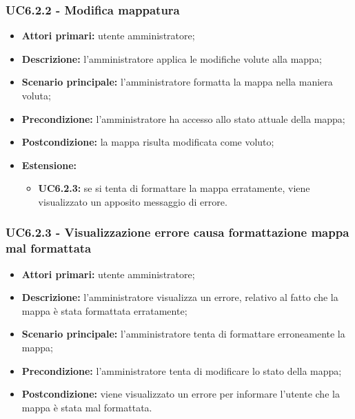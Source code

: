 	\subsubsection{UC6.2.2 - Modifica mappatura}
	\begin{itemize}
		\item \textbf{Attori primari:} utente amministratore;
		\item \textbf{Descrizione:} l'amministratore applica le modifiche volute alla mappa;
		\item \textbf{Scenario principale:} l'amministratore formatta la mappa nella maniera voluta;		
		\item \textbf{Precondizione:} l'amministratore ha accesso allo stato attuale della mappa;
		\item \textbf{Postcondizione:} la mappa risulta modificata come voluto;
		\item \textbf{Estensione:}
		\begin{itemize}
			\item \textbf{UC6.2.3:} se si tenta di formattare la mappa erratamente, viene visualizzato un apposito messaggio di errore.
		\end{itemize}
	\end{itemize}

\subsubsection{UC6.2.3 - Visualizzazione errore causa formattazione mappa mal formattata}
	\begin{itemize}
		\item \textbf{Attori primari:} utente amministratore;
		\item \textbf{Descrizione:} l'amministratore visualizza un errore, relativo al fatto che la mappa è stata formattata erratamente;
		\item \textbf{Scenario principale:} l'amministratore tenta di formattare erroneamente la mappa;
		\item \textbf{Precondizione:} l'amministratore tenta di modificare lo stato della mappa;
		\item \textbf{Postcondizione:} viene visualizzato un errore per informare l'utente che la mappa è stata mal formattata.
	\end{itemize}

